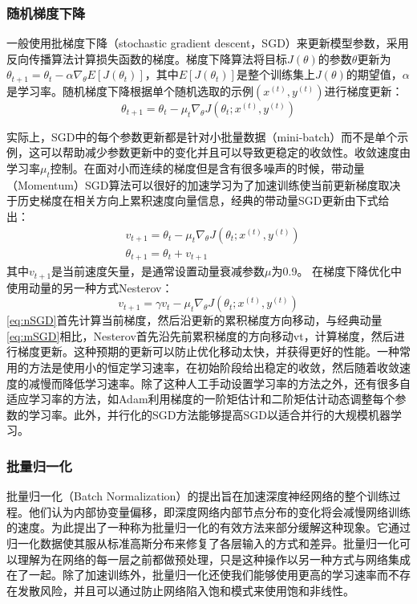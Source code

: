 \subsubsection{随机梯度下降}\label{SGD_optimization}
一般使用批梯度下降（stochastic gradient descent，SGD）来更新模型参数，采用反向传播算法计算损失函数的梯度。梯度下降算法将目标$ J(\theta)$的参数$ \theta $更新为$ \theta_{t + 1} = \theta_t - \alpha \nabla_\theta E [J(\theta_t)] $，其中$ E [J(\theta_t)] $是整个训练集上$ J(\theta)$的期望值，$ \alpha $是学习率。随机梯度下降根据单个随机选取的示例$(x ^ {(t)},y ^ {(t)})$进行梯度更新：
\begin{equation}
\label{eq:SGD}
\theta_{t+1} = \theta_t - \mu_t \nabla_\theta J(\theta_t; x^{(t)},y^{(t)})
\end{equation}

实际上，SGD中的每个参数更新都是针对小批量数据（mini-batch）而不是单个示例，这可以帮助减少参数更新中的变化并且可以导致更稳定的收敛性。收敛速度由学习率$ \mu_t $控制。在面对小而连续的梯度但是含有很多噪声的时候，带动量（Momentum）SGD算法可以很好的加速学习为了加速训练使当前更新梯度取决于历史梯度在相关方向上累积速度向量信息，经典的带动量SGD更新由下式给出：
\begin{equation}    \label{eq:mSGD}
\begin{aligned}
   & v_{t+1} = \theta_t - \mu_t \nabla_\theta J(\theta_t; x^{(t)},y^{(t)})\\
   & \theta_{t+1} = \theta_t +v_{t+1} 
\end{aligned}
\end{equation}
其中$v_{t+1}$是当前速度矢量，是通常设置动量衰减参数$\mu$为0.9。 在梯度下降优化中使用动量的另一种方式Nesterov\cite{Krizhevsky2012}：
\begin{equation}
    \label{eq:nSGD}
    v_{t+1} = \gamma v_t - \mu_t \nabla_\theta J(\theta_t; x^{(t)},y^{(t)})
\end{equation}
\ref{eq:nSGD}首先计算当前梯度，然后沿更新的累积梯度方向移动，与经典动量\ref{eq:mSGD}相比，Nesterov首先沿先前累积梯度的方向移动vt，计算梯度，然后进行梯度更新。这种预期的更新可以防止优化移动太快，并获得更好的性能。一种常用的方法是使用小的恒定学习速率，在初始阶段给出稳定的收敛，然后随着收敛速度的减慢而降低学习速率。除了这种人工手动设置学习率的方法之外，还有很多自适应学习率的方法，如Adam\cite{Kingma2014Adam}利用梯度的一阶矩估计和二阶矩估计动态调整每个参数的学习率。此外，并行化的SGD方法能够提高SGD以适合并行的大规模机器学习。

\subsubsection{批量归一化}
批量归一化（Batch Normalization）\cite{Ioffe2014Batch}的提出旨在加速深度神经网络的整个训练过程。他们认为内部协变量偏移，即深度网络内部节点分布的变化将会减慢网络训练的速度。为此提出了一种称为批量归一化的有效方法来部分缓解这种现象。它通过归一化数据使其服从标准高斯分布来修复了各层输入的方式和差异。批量归一化可以理解为在网络的每一层之前都做预处理，只是这种操作以另一种方式与网络集成在了一起。除了加速训练外，批量归一化还使我们能够使用更高的学习速率而不存在发散风险，并且可以通过防止网络陷入饱和模式来使用饱和非线性。
